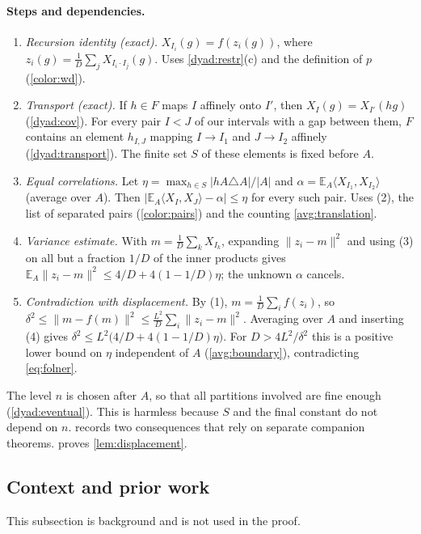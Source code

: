 \documentclass[11pt]{article}
\newcommand{\norm}[1]{\lVert #1\rVert}
\newcommand{\ip}[2]{\langle #1,#2\rangle}
\theoremstyle{definition}
\numberwithin{equation}{section}
\newcommand{\EA}{\mathbb E_A}
\begin{document}
\paragraph{Steps and dependencies.}
\begin{enumerate}[label=(\arabic*)]
\item \emph{Recursion identity (exact).}
\(X_{I_i}(g)=f(z_i(g))\), where \(z_i(g)=\frac1D\sum_j X_{I_i\cdot I_j}(g)\).
Uses \cref{dyad:restr}(c) and the definition of \(p\) (\cref{color:wd}).
\item \emph{Transport (exact).}
If \(h\in F\) maps \(I\) affinely onto \(I'\), then \(X_I(g)=X_{I'}(hg)\)
(\cref{dyad:cov}). For every pair \(I<J\) of our intervals with a gap
between them, \(F\) contains an element \(h_{I,J}\) mapping \(I\to I_1\) and
\(J\to I_2\) affinely (\cref{dyad:transport}). The finite set \(S\) of these
elements is fixed before \(A\).
\item \emph{Equal correlations.}
Let \(\eta=\max_{h\in S}|hA\triangle A|/|A|\) and
\(\alpha=\EA\ip{X_{I_1}}{X_{I_2}}\) (average over \(A\)).
Then \(|\EA\ip{X_I}{X_J}-\alpha|\le\eta\) for every such pair.
Uses (2), the list of separated pairs (\cref{color:pairs}) and the counting
\cref{avg:translation}.
\item \emph{Variance estimate.}
With \(m=\frac1D\sum_kX_{I_k}\), expanding
\(\norm{z_i-m}^2\) and using (3) on all but a fraction \(1/D\) of the
inner products gives
\(\EA\norm{z_i-m}^2\le 4/D+4(1-1/D)\eta\); the unknown \(\alpha\)
cancels.
\item \emph{Contradiction with displacement.}
By (1), \(m=\frac1D\sum_i f(z_i)\), so
\(\delta^2\le\norm{m-f(m)}^2\le\frac{L^2}{D}\sum_i\norm{z_i-m}^2\).
Averaging over \(A\) and inserting (4) gives
\(\delta^2\le L^2\bigl(4/D+4(1-1/D)\eta\bigr)\). For \(D>4L^2/\delta^2\)
this is a positive lower bound on \(\eta\) independent of \(A\)
(\cref{avg:boundary}), contradicting \eqref{eq:folner}.
\end{enumerate}
The level \(n\) is chosen after \(A\), so that all partitions involved are
fine enough (\cref{dyad:eventual}). This is harmless because \(S\) and the
final constant do not depend on \(n\).
 records two consequences that rely on separate
companion theorems.  proves \cref{lem:displacement}.

\subsection{Context and prior work}
This subsection is background and is not used in the proof.
\end{document}
